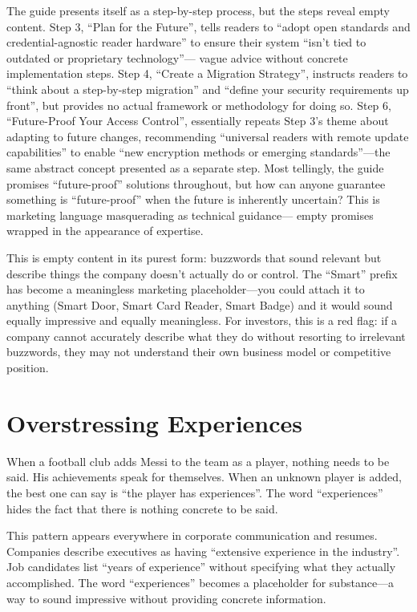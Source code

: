 The guide presents itself as a step-by-step process, 
but the steps reveal empty content. Step 3, ``Plan for the Future'', 
tells readers to ``adopt open standards and credential-agnostic reader hardware'' 
to ensure their system ``isn't tied to outdated or proprietary technology''— 
vague advice without concrete implementation steps. 
Step 4, ``Create a Migration Strategy'', instructs readers to 
``think about a step-by-step migration'' and ``define your security requirements up front'', 
but provides no actual framework or methodology for doing so. 
Step 6, ``Future-Proof Your Access Control'', essentially repeats Step 3's theme 
about adapting to future changes, recommending ``universal readers with remote update capabilities'' 
to enable ``new encryption methods or emerging standards''—the same abstract concept 
presented as a separate step. Most tellingly, the guide promises ``future-proof'' solutions 
throughout, but how can anyone guarantee something is ``future-proof'' 
when the future is inherently uncertain? 
This is marketing language masquerading as technical guidance— 
empty promises wrapped in the appearance of expertise.

This is empty content in its purest form: buzzwords that sound 
relevant but describe things the company doesn't actually do or control. The ``Smart'' prefix has become a meaningless marketing placeholder—you could attach it to anything (Smart Door, Smart Card Reader, Smart Badge) and it would sound equally impressive and equally meaningless. For investors, this is a red flag: if a company cannot accurately describe what they do without resorting to irrelevant buzzwords, they may not understand their own business model or competitive position.

\section{Overstressing Experiences}

When a football club adds Messi to the team as a player, nothing needs to be said. His achievements speak for themselves. When an unknown player is added, the best one can say is ``the player has experiences''. The word ``experiences'' hides the fact that there is nothing concrete to be said.

This pattern appears everywhere in corporate communication and resumes. Companies describe executives as having ``extensive experience in the industry''. Job candidates list ``years of experience'' without specifying what they actually accomplished. The word ``experiences'' becomes a placeholder for substance—a way to sound impressive without providing concrete information.

